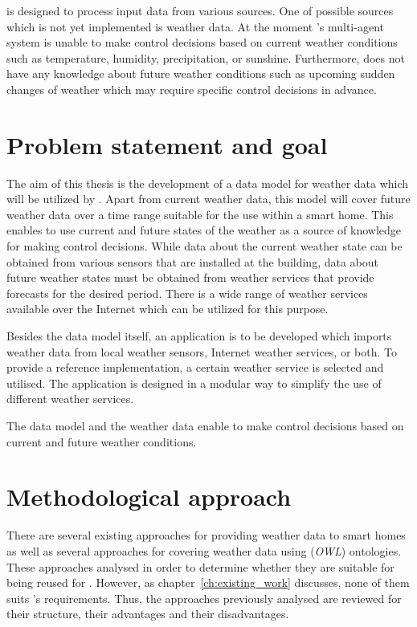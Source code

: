 \thinkhome is designed to process input data from various sources. One of possible sources which is not yet implemented is weather data. At the moment \thinkhome's multi-agent system is unable to make control decisions based on current weather conditions such as temperature, humidity, precipitation, or sunshine. Furthermore, \thinkhome does not have any knowledge about future weather conditions such as upcoming sudden changes of weather which may require specific control decisions in advance.

\section{Problem statement and goal}

The aim of this thesis is the development of a data model for weather data which will be utilized by \thinkhome. Apart from current weather data, this model will cover future weather data over a time range suitable for the use within a smart home. This enables \thinkhome to use current and future states of the weather as a source of knowledge for making control decisions. While data about the current weather state can be obtained from various sensors that are installed at the building, data about future weather states must be obtained from weather services that provide forecasts for the desired period. There is a wide range of weather services available over the Internet which can be utilized for this purpose.

Besides the data model itself, an application is to be developed which imports weather data from local weather sensors, Internet weather services, or both. To provide a reference implementation, a certain weather service is selected and utilised. The application is designed in a modular way to simplify the use of different weather services.

The data model and the weather data enable \thinkhome to make control decisions based on current and future weather conditions.

\section{Methodological approach}

There are several existing approaches for providing weather data to smart homes as well as several approaches for covering weather data using (\emph{OWL}) ontologies. These approaches analysed in order to determine whether they are suitable for being reused for \thinkhome. However, as chapter~\ref{ch:existing_work} discusses, none of them suits \thinkhome's requirements. Thus, the approaches previously analysed are reviewed for their structure, their advantages and their disadvantages.

